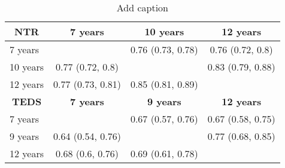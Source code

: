 \begin{table}[htbp]
  \centering
  \caption{Add caption}
    \begin{tabular}{lccr}
    \toprule
    \multicolumn{1}{c}{\textbf{NTR}} & \textbf{7 years} & \textbf{10 years} & \multicolumn{1}{c}{\textbf{12 years}} \\
    \midrule
    7 years &       & 0.76 (0.73, 0.78) & \multicolumn{1}{c}{0.76 (0.72, 0.8)} \\
    10 years & 0.77 (0.72, 0.8) &       & \multicolumn{1}{c}{0.83 (0.79, 0.88)} \\
    12 years & 0.77 (0.73, 0.81) & 0.85 (0.81, 0.89) &  \\
    \midrule
    \multicolumn{1}{c}{\textbf{TEDS}} & \textbf{7 years} & \textbf{9 years} & \multicolumn{1}{c}{\textbf{12 years}} \\
    \midrule
    7  years &       & 0.67 (0.57, 0.76) & \multicolumn{1}{c}{0.67 (0.58, 0.75)} \\
    9  years & 0.64 (0.54, 0.76) &       & \multicolumn{1}{c}{0.77 (0.68, 0.85)} \\
    12 years & 0.68 (0.6, 0.76) & 0.69 (0.61, 0.78) &  \\
    \bottomrule
    \end{tabular}%
  \label{tab:addlabel}%
\end{table}%
